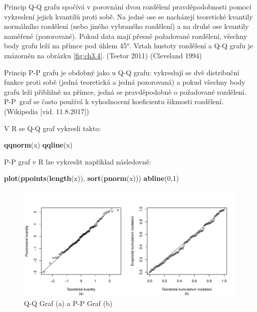 \documentclass[12pt,]{article}
\newenvironment{Shaded}{\begin{snugshade}}{\end{snugshade}}
\newcommand{\KeywordTok}[1]{\textcolor[rgb]{0.13,0.29,0.53}{\textbf{#1}}}
\newcommand{\DecValTok}[1]{\textcolor[rgb]{0.00,0.00,0.81}{#1}}
\newcommand{\NormalTok}[1]{#1}
\begin{document}
\qquad Princip Q-Q grafu spočívá v porovnání dvou rozdělení
pravděpodobnosti pomocí vykreslení jejich kvantilů proti sobě. Na jedné
ose se nacházejí teoretické kvantily normálního rozdělení (nebo jiného
vybraného rozdělení) a na druhé ose kvantily naměřené (pozorované).
Pokud data mají přesně požadované rozdělení, všechny body grafu leží na
přímce pod úhlem 45°. Vztah hustoty rozdělení a Q-Q grafu je znázorněn
na obrázku \ref{fig:ch3.4}. (Teetor 2011) (Cleveland 1994)

\qquad Princip P-P grafu je obdobný jako u Q-Q grafu: vykreslují se dvě
distribuční funkce proti sobě (jedná teoretická a jedná pozorovaná) a
pokud všechny body grafu leží přibližně na přímce, jedná se
pravděpodobně o požadované rozdělení. \mbox{P-P}~graf se často používá k
vyhodnocení koeficientu šikmosti rozdělení.(Wikipedia {[}vid.
11.8.2017{]})

V R se Q-Q graf vykreslí takto:

\begin{Shaded}
\begin{Highlighting}[]
\KeywordTok{qqnorm}\NormalTok{(x)}
\KeywordTok{qqline}\NormalTok{(x)}
\end{Highlighting}
\end{Shaded}

P-P graf v R lze vykreslit například následovně:

\begin{Shaded}
\begin{Highlighting}[]
\KeywordTok{plot}\NormalTok{(}\KeywordTok{ppoints}\NormalTok{(}\KeywordTok{length}\NormalTok{(x)), }\KeywordTok{sort}\NormalTok{(}\KeywordTok{pnorm}\NormalTok{(x)))}
\KeywordTok{abline}\NormalTok{(}\DecValTok{0}\NormalTok{,}\DecValTok{1}\NormalTok{)}
\end{Highlighting}
\end{Shaded}

\begin{figure}[H]

{\centering \includegraphics{BP_files/figure-latex/pp-qq plots-1} 

}

\caption{\label{fig:ch2.3} Q-Q Graf (a) a P-P Graf (b)}\label{fig:pp-qq plots}
\end{figure}
\end{document}
